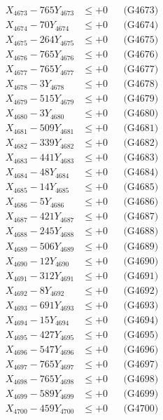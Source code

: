 \documentclass[a4paper,10pt]{article}
\begin{document}
{\begin{align}
X_{4673} - 765Y_{4673} &\leq +0 && \text{(G4673)} \\
X_{4674} - 70Y_{4674} &\leq +0 && \text{(G4674)} \\
X_{4675} - 264Y_{4675} &\leq +0 && \text{(G4675)} \\
X_{4676} - 765Y_{4676} &\leq +0 && \text{(G4676)} \\
X_{4677} - 765Y_{4677} &\leq +0 && \text{(G4677)} \\
X_{4678} - 3Y_{4678} &\leq +0 && \text{(G4678)} \\
X_{4679} - 515Y_{4679} &\leq +0 && \text{(G4679)} \\
X_{4680} - 3Y_{4680} &\leq +0 && \text{(G4680)} \\
\allowbreak
X_{4681} - 509Y_{4681} &\leq +0 && \text{(G4681)} \\
X_{4682} - 339Y_{4682} &\leq +0 && \text{(G4682)} \\
X_{4683} - 441Y_{4683} &\leq +0 && \text{(G4683)} \\
X_{4684} - 48Y_{4684} &\leq +0 && \text{(G4684)} \\
X_{4685} - 14Y_{4685} &\leq +0 && \text{(G4685)} \\
X_{4686} - 5Y_{4686} &\leq +0 && \text{(G4686)} \\
X_{4687} - 421Y_{4687} &\leq +0 && \text{(G4687)} \\
X_{4688} - 245Y_{4688} &\leq +0 && \text{(G4688)} \\
X_{4689} - 506Y_{4689} &\leq +0 && \text{(G4689)} \\
X_{4690} - 12Y_{4690} &\leq +0 && \text{(G4690)} \\
\allowbreak
X_{4691} - 312Y_{4691} &\leq +0 && \text{(G4691)} \\
X_{4692} - 8Y_{4692} &\leq +0 && \text{(G4692)} \\
X_{4693} - 691Y_{4693} &\leq +0 && \text{(G4693)} \\
X_{4694} - 15Y_{4694} &\leq +0 && \text{(G4694)} \\
X_{4695} - 427Y_{4695} &\leq +0 && \text{(G4695)} \\
X_{4696} - 547Y_{4696} &\leq +0 && \text{(G4696)} \\
X_{4697} - 765Y_{4697} &\leq +0 && \text{(G4697)} \\
X_{4698} - 765Y_{4698} &\leq +0 && \text{(G4698)} \\
X_{4699} - 589Y_{4699} &\leq +0 && \text{(G4699)} \\
X_{4700} - 459Y_{4700} &\leq +0 && \text{(G4700)} \\

\end{align}}
\end{document}
